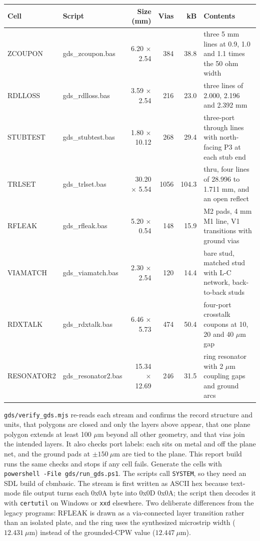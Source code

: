 \documentclass[10pt,letterpaper]{article}
\newcommand{\subhead}[1]{\par\addvspace{7pt}\noindent{\large\bfseries\color{teal}#1}\par\nobreak\vspace{2pt}}
\begin{document}
\subhead{Cells}
{\small \par\noindent\begin{tabular}{@{}llrrrp{.30\linewidth}@{}}\toprule
Cell & Script & Size (mm) & Vias & kB & Contents\\\midrule
ZCOUPON & gds\_zcoupon.bas & 6.20 $\times$ 2.54 & 384 & 38.8 & three 5 mm lines at 0.9, 1.0 and 1.1 times the 50 ohm width\\
RDLLOSS & gds\_rdlloss.bas & 3.59 $\times$ 2.54 & 216 & 23.0 & three lines of 2.000, 2.196 and 2.392 mm\\
STUBTEST & gds\_stubtest.bas & 1.80 $\times$ 10.12 & 268 & 29.4 & three-port through lines with north-facing P3 at each stub end\\
TRLSET & gds\_trlset.bas & 30.20 $\times$ 5.54 & 1056 & 104.3 & thru, four lines of 28.996 to 1.711 mm, and an open reflect\\
RFLEAK & gds\_rfleak.bas & 5.20 $\times$ 0.54 & 148 & 15.9 & M2 pads, 4 mm M1 line, V1 transitions with ground vias\\
VIAMATCH & gds\_viamatch.bas & 2.30 $\times$ 2.54 & 120 & 14.4 & bare stud, matched stud with L-C network, back-to-back studs\\
RDXTALK & gds\_rdxtalk.bas & 6.46 $\times$ 5.73 & 474 & 50.4 & four-port crosstalk coupons at 10, 20 and 40 \ensuremath{\mu\mathrm{m}} gap\\
RESONATOR2 & gds\_resonator2.bas & 15.34 $\times$ 12.69 & 246 & 31.5 & ring resonator with 2 \ensuremath{\mu\mathrm{m}} coupling gaps and ground arcs\\\bottomrule
\end{tabular}\par
}
\subhead{Checks and generation}
\texttt{gds/verify\_gds.mjs} re-reads each stream and confirms the record structure and units, that polygons are closed and only the layers above appear, that one plane polygon extends at least 100 $\mu$m beyond all other geometry, and that vias join the intended layers. It also checks port labels: each sits on metal and off the plane net, and the ground pads at $\pm150\ \mu$m are tied to the plane. This report build runs the same checks and stops if any cell fails.
Generate the cells with \texttt{powershell -File gds/run\_gds.ps1}. The scripts call \texttt{SYSTEM}, so they need an SDL build of cbmbasic. The stream is first written as ASCII hex because text-mode file output turns each 0x0A byte into 0x0D 0x0A; the script then decodes it with \texttt{certutil} on Windows or \texttt{xxd} elsewhere. Two deliberate differences from the legacy programs: RFLEAK is drawn as a via-connected layer transition rather than an isolated plate, and the ring uses the synthesized microstrip width ($12.431\ \mu$m) instead of the grounded-CPW value ($12.447\ \mu$m).
\end{document}
